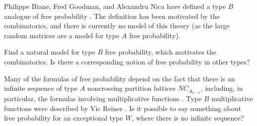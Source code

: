 \documentclass[12pt,letterpaper, reqno]{amsart}
\begin{document}
\begin{problemblock} \label{prob:freeprobability} Philippe Biane, Fred Goodman, and Alexandru Nica have defined a type $B$ analogue of free probability \cite{biane-goodman-nica}. The definition has been motivated by the combinatorics, and there is currently no model of this theory (as the large random matrices are a model for type $A$ free probability).

\begin{problem}
Find a natural model for type $B$ free probability, which motivates the combinatorics. Is there a corresponding notion of free probability in other types?
\end{problem}

\begin{remark} Many of the formulas of free probability depend on the fact that there is an infinite sequence of type $A$ noncrossing partition lattices $NC_{A_{n-1}}$, including, in particular, the formulas involving multiplicative functions \cite{speicher}. Type $B$ multiplicative functions were described by Vic Reiner \cite{reiner}. Is it possible to say something about free probability for an exceptional type $W$, where there is no infinite sequence?
\end{remark}

\end{problemblock}
\end{document}
